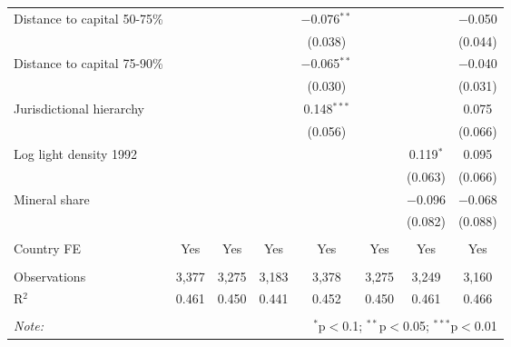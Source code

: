 \begin{table}[!htbp]
\begin{tabular}{@{\extracolsep{2pt}}lccccccc}
  Distance to capital 50-75\% &  &  &  & $-$0.076$^{**}$ &  &  & $-$0.050 \\ 
  &  &  &  & (0.038) &  &  & (0.044) \\ 
  Distance to capital 75-90\% &  &  &  & $-$0.065$^{**}$ &  &  & $-$0.040 \\ 
  &  &  &  & (0.030) &  &  & (0.031) \\ 
  Jurisdictional hierarchy &  &  &  & 0.148$^{***}$ &  &  & 0.075 \\ 
  &  &  &  & (0.056) &  &  & (0.066) \\ 
  Log light density 1992 &  &  &  &  &  & 0.119$^{*}$ & 0.095 \\ 
  &  &  &  &  &  & (0.063) & (0.066) \\ 
  Mineral share &  &  &  &  &  & $-$0.096 & $-$0.068 \\ 
  &  &  &  &  &  & (0.082) & (0.088) \\ 
 \hline \\[-1.8ex] 
Country FE & Yes & Yes & Yes & Yes & Yes & Yes & Yes \\ 
\hline \\[-1.8ex] 
Observations & 3,377 & 3,275 & 3,183 & 3,378 & 3,275 & 3,249 & 3,160 \\ 
R$^{2}$ & 0.461 & 0.450 & 0.441 & 0.452 & 0.450 & 0.461 & 0.466 \\ 
\hline 
\hline \\[-1.8ex] 
\textit{Note:}  & \multicolumn{7}{r}{$^{*}$p$<$0.1; $^{**}$p$<$0.05; $^{***}$p$<$0.01} \\ 
\end{tabular} 
\end{table} 

